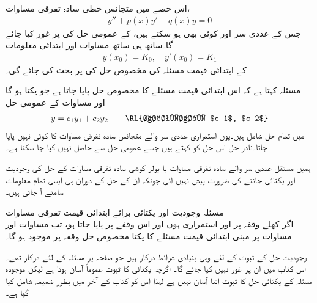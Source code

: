اس حصے میں متجانس خطی سادہ تفرقی مساوات،
\begin{align}\label{مساوات_سادہ_دو_وجودیت_مخصوص_الف}
y''+p(x)y'+q(x)y=0
\end{align}
جس کے عددی سر  اور  کوئی بھی  ہو سکتے  ہیں، کے عمومی حل کی  پر غور کیا جائے گا۔ساتھ ہی ساتھ مساوات  اور  ابتدائی معلومات
\begin{align}\label{مساوات_سادہ_دو_وجودیت_مخصوص_ب}
y(x_0)=K_0, \quad y'(x_0)=K_1
\end{align}
کے  ابتدائی قیمت مسئلہ کی مخصوص حل کی  پر بحث کی جائے گی۔ 

مسئلہ  کہتا ہے کہ اس ابتدائی قیمت مسئلے کا مخصوص حل پایا جاتا ہے جو یکتا ہو گا اور مساوات  کے عمومی حل
\begin{align}
y=c_1y_1+c_2y_2\quad \quad \text{\RL{اختیاری $c_1$, $c_2$}}
\end{align}
میں تمام حل شامل ہیں۔یوں استمراری عددی سر والے متجانس سادہ تفرقی مساوات کا کوئی  نہیں پایا جاتا۔نادر حل اس حل کو کہتے ہیں جسے عمومی حل سے حاصل نہیں کیا جا سکتا ہے۔

ہمیں مستقل عددی سر والے سادہ تفرقی مساوات یا یولر کوشی سادہ تفرقی مساوات کے حل کی وجودیت اور یکتائی جاننے کی ضرورت پیش نہیں آئی چونکہ ان کے حل کے دوران ہی ایسی تمام معلومات سامنے آ جاتی ہیں۔


\quad مسئلہ وجودیت اور یکتائی برائے ابتدائی قیمت تفرقی مساوات\\
اگر کھلے وقفہ  پر   اور   استمراری ہوں اور  اس وقفے پر پایا جاتا ہو، تب   مساوات  اور مساوات  پر مبنی ابتدائی قیمت مسئلے کا  یکتا مخصوص حل  وقفہ  پر  موجود ہو گا۔  

وجودیت حل کے ثبوت کے لئے وہی بنیادی شرائط درکار ہیں جو صفحہ  پر مسئلہ  کے لئے درکار تھے۔اس کتاب میں ان پر غور نہیں کیا جائے گا۔ اگرچہ یکتائی کا ثبوت عموماً آسان ہوتا ہے لیکن موجودہ مسئلہ  کے یکتائی حل کا ثبوت اتنا آسان نہیں ہے لہٰذا اس کو کتاب کے آخر میں بطور ضمیمہ  شامل کیا گیا ہے۔ 

